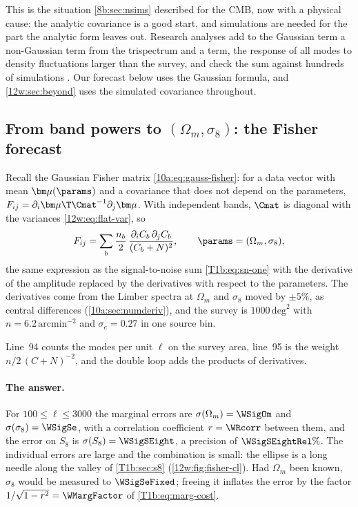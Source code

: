 This is the situation \cref{8b:sec:nsims} described for the CMB, now with a physical cause: the analytic covariance is
a good start, and simulations are needed for the part the analytic form leaves out. Research analyses add to the
Gaussian term a non-Gaussian term from the trispectrum and a  term, the response of all modes to
density fluctuations larger than the survey, and check the sum against hundreds of simulations
\cite{Asgari2021KiDS,Takahashi2017sims}. Our forecast below uses the Gaussian formula, and \cref{12w:sec:beyond} uses
the simulated covariance throughout.

\subsection{From band powers to \texorpdfstring{$(\Omega_m,\sigma_8)$}{(Omega m, sigma 8)}: the Fisher forecast}
\label{12w:sec:cl-fisher}

Recall the Gaussian Fisher matrix \eqref{10a:eq:gauss-fisher}: for a data vector with mean $\bm\mu(\params)$ and a
covariance that does not depend on the parameters, $F_{ij}=\partial_i\bm\mu\T\Cmat^{-1}\partial_j\bm\mu$. With
independent bands, $\Cmat$ is diagonal with the variances \eqref{12w:eq:flat-var}, so
\begin{equation}
F_{ij}=\sum_b\frac{n_b}{2}\,\frac{\partial_iC_b\,\partial_jC_b}{(C_b+N)^2},
\qquad\params=(\Omega_m,\sigma_8),
\label{12w:eq:cl-fisher}
\end{equation}
the same expression as the signal-to-noise sum \eqref{T1b:eq:sn-one} with the derivative of the amplitude replaced
by the derivatives with respect to the parameters. The derivatives come from the Limber spectra at
$\Omega_m$ and $\sigma_8$ moved by $\pm5\%$, as central differences (\cref{10a:sec:numderiv}), and the survey is
$1000\,\mathrm{deg}^2$ with $n=6.2\,\mathrm{arcmin}^{-2}$ and $\sigma_e=0.27$ in one source bin.


Line~94 counts the modes per unit $\ell$ on the survey area, line~95 is the weight $n/2\,(C+N)^{-2}$, and the double
loop adds the products of derivatives.

\paragraph{The answer.} For $100\le\ell\le3000$ the marginal errors are $\sigma(\Omega_m)=\WSigOm$ and
$\sigma(\sigma_8)=\WSigSe$, with a correlation coefficient $r=\WRcorr$ between them, and the error on
$S_8$ is $\sigma(S_8)=\WSigSEight$, a precision of $\WSigSEightRel\%$. The individual errors are large and the
combination is small: the ellipse is a long needle along the valley of \cref{T1b:sec:s8}
(\cref{12w:fig:fisher-cl}). Had $\Omega_m$ been known, $\sigma_8$ would be measured to $\WSigSeFixed$; freeing it
inflates the error by the factor $1/\sqrt{1-r^2}=\WMargFactor$ of \eqref{T1b:eq:marg-cost}.

